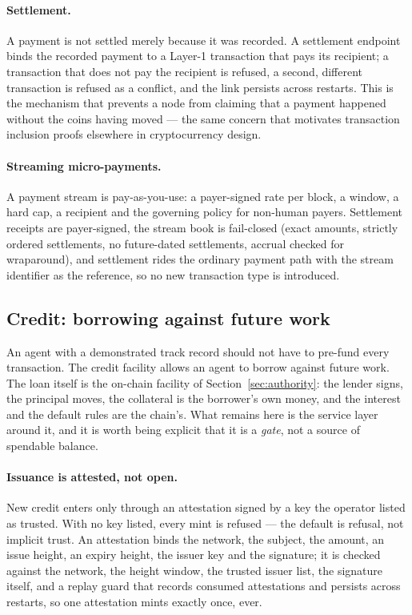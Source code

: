 \documentclass{article}
\begin{document}
\paragraph{Settlement.} A payment is not settled merely because it was
recorded. A settlement endpoint binds the recorded payment to a Layer-1
transaction that pays its recipient; a transaction that does not pay the
recipient is refused, a second, different transaction is refused as a
conflict, and the link persists across restarts. This is the mechanism that
prevents a node from claiming that a payment happened without the coins having
moved --- the same concern that motivates transaction inclusion proofs
elsewhere in cryptocurrency design.

\paragraph{Streaming micro-payments.} A payment stream is pay-as-you-use: a
payer-signed rate per block, a window, a hard cap, a recipient and the
governing policy for non-human payers. Settlement receipts are payer-signed,
the stream book is fail-closed (exact amounts, strictly ordered settlements,
no future-dated settlements, accrual checked for wraparound), and settlement
rides the ordinary payment path with the stream identifier as the reference, so
no new transaction type is introduced.

\subsection{Credit: borrowing against future work}
\label{sec:credit}

An agent with a demonstrated track record should not have to pre-fund every
transaction. The credit facility allows an agent to borrow against future
work. The loan itself is the on-chain facility of
Section~\ref{sec:authority}: the lender signs, the principal moves, the
collateral is the borrower's own money, and the interest and the default rules
are the chain's. What remains here is the service layer around it, and it is
worth being explicit that it is a \emph{gate}, not a source of spendable
balance.

\paragraph{Issuance is attested, not open.} New credit enters only through an
attestation signed by a key the operator listed as trusted. With no key
listed, every mint is refused --- the default is refusal, not implicit trust.
An attestation binds the network, the subject, the amount, an issue height, an
expiry height, the issuer key and the signature; it is checked against the
network, the height window, the trusted issuer list, the signature itself, and
a replay guard that records consumed attestations and persists across
restarts, so one attestation mints exactly once, ever.
\end{document}
